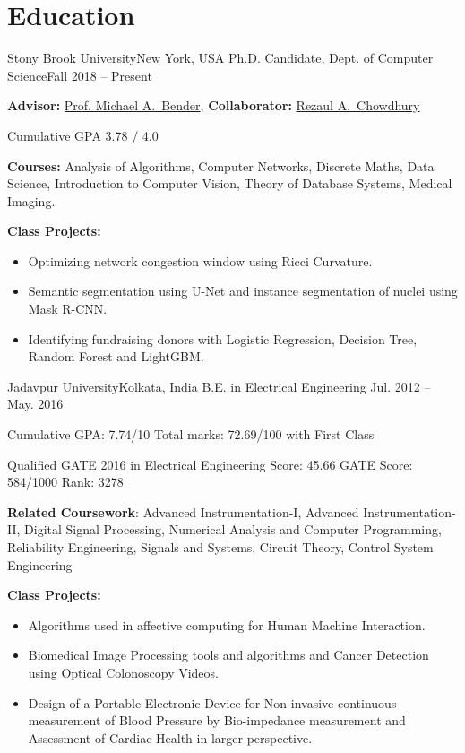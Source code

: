 \documentclass[letterpaper,10pt]{article}
\begin{document}
\section*{Education}
\resumeSubHeadingListStart
\resumeSubheading
{Stony Brook University}{New York, USA}
{Ph.D. Candidate, Dept. of Computer Science}{Fall 2018 -- Present}
\resumeItemListStart
\item \textbf{Advisor:} \href{https://www3.cs.stonybrook.edu/~bender/}{Prof. Michael A.\ Bender}, \textbf{Collaborator:} \href{https://www3.cs.stonybrook.edu/~rezaul/}{Rezaul A.\ Chowdhury}
\item Cumulative GPA 3.78 / 4.0
\item \textbf{Courses:} Analysis of Algorithms, Computer Networks, Discrete Maths, Data Science, Introduction to Computer Vision, Theory of Database Systems, Medical Imaging.
\item \textbf{Class Projects:} 
\begin{itemize}
    \item {Optimizing network congestion window using Ricci Curvature.}
    \item {Semantic segmentation using U-Net and instance segmentation of nuclei using Mask R-CNN.}
    \item {Identifying fundraising donors with Logistic Regression, Decision Tree, Random Forest and LightGBM.}
\end{itemize}
\resumeItemListEnd
\resumeSubheading
{Jadavpur University}{Kolkata, India}
{B.E. in Electrical Engineering }{Jul. 2012 -- May. 2016}
\resumeItemListStart
\item {Cumulative GPA: 7.74/10 Total marks: 72.69/100 with First Class}
\item {Qualified GATE 2016 in Electrical Engineering Score: 45.66 GATE Score: 584/1000 Rank: 3278}
\item {\textbf{Related Coursework}: Advanced Instrumentation-I, Advanced Instrumentation-II, Digital Signal Processing, Numerical Analysis and Computer Programming, Reliability Engineering, Signals and Systems, Circuit Theory, Control System Engineering}
\item \textbf{Class Projects:} 
\begin{itemize}
    \item {Algorithms used in affective computing for Human Machine Interaction.}
    \item {Biomedical Image Processing tools and algorithms and Cancer Detection using Optical Colonoscopy Videos.}
    \item {Design of a Portable Electronic Device for Non-invasive continuous measurement of Blood Pressure by Bio-impedance measurement and Assessment of Cardiac Health in larger perspective.}
\end{itemize}
\resumeItemListEnd
\resumeSubHeadingListEnd 
\end{document}
